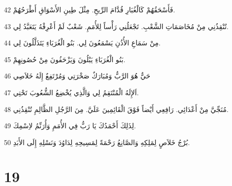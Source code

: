 \par 42 فَأَسْحَقُهُمْ كَالْغُبَارِ قُدَّامَ الرِّيحِ. مِثْلَ طِينِ الأَسْوَاقِ أَطْرَحُهُمْ.
\par 43 تُنْقِذُنِي مِنْ مُخَاصَمَاتِ الشَّعْبِ. تَجْعَلُنِي رَأْساً لِلأُمَمِ. شَعْبٌ لَمْ أَعْرِفْهُ يَتَعَبَّدُ لِي.
\par 44 مِنْ سَمَاعِ الأُذُنِ يَسْمَعُونَ لِي. بَنُو الْغُرَبَاءِ يَتَذَلَّلُونَ لِي.
\par 45 بَنُو الْغُرَبَاءِ يَبْلُونَ وَيَزْحَفُونَ مِنْ حُصُونِهِمْ.
\par 46 حَيٌّ هُوَ الرَّبُّ وَمُبَارَكٌ صَخْرَتِي وَمُرْتَفِعٌ إِلَهُ خَلاَصِي
\par 47 اَلإِلَهُ الْمُنْتَقِمُ لِي وَالَّذِي يُخْضِعُ الشُّعُوبَ تَحْتِي.
\par 48 مُنَجِّيَّ مِنْ أَعْدَائِي. رَافِعِي أَيْضاً فَوْقَ الْقَائِمِينَ عَلَيَّ. مِنَ الرَّجُلِ الظَّالِمِ تُنْقِذُنِي.
\par 49 لِذَلِكَ أَحْمَدُكَ يَا رَبُّ فِي الأُمَمِ وَأُرَنِّمُ لاِسْمِكَ.
\par 50 بُرْجُ خَلاَصٍ لِمَلِكِهِ وَالصَّانِعُ رَحْمَةً لِمَسِيحِهِ لِدَاوُدَ وَنَسْلِهِ إِلَى الأَبَدِ.

\chapter{19}

